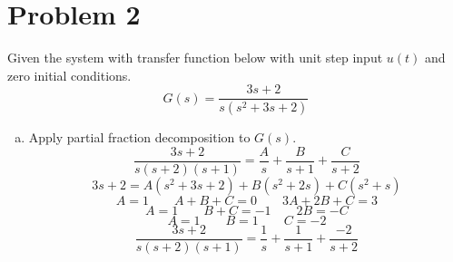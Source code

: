 \documentclass{article}
\begin{document}
\newpage
\section*{Problem 2}
Given the system with transfer function below with unit step input $u(t)$ and zero initial conditions.
$$ G(s) = \frac{3s + 2}{s(s^2+3s+2)} $$

\begin{enumerate}[a.]
\item Apply partial fraction decomposition to $G(s)$.
$$ \frac{3s + 2}{s(s+2)(s+1)} = \frac{A}{s} + \frac{B}{s+1} + \frac{C}{s+2} $$
$$ 3s + 2 = {A}(s^2+3s+2) + B(s^2+2s) + C(s^2+s) $$
$$ A = 1 \qquad A + B + C = 0 \qquad 3A + 2B + C = 3 $$
$$ A = 1 \qquad B + C = -1 \qquad 2B = -C $$
$$ A = 1 \qquad B = 1 \qquad C = -2 $$
$$ \frac{3s + 2}{s(s+2)(s+1)} = \frac{1}{s} + \frac{1}{s+1} + \frac{-2}{s+2} $$


\end{enumerate}
\end{document}
